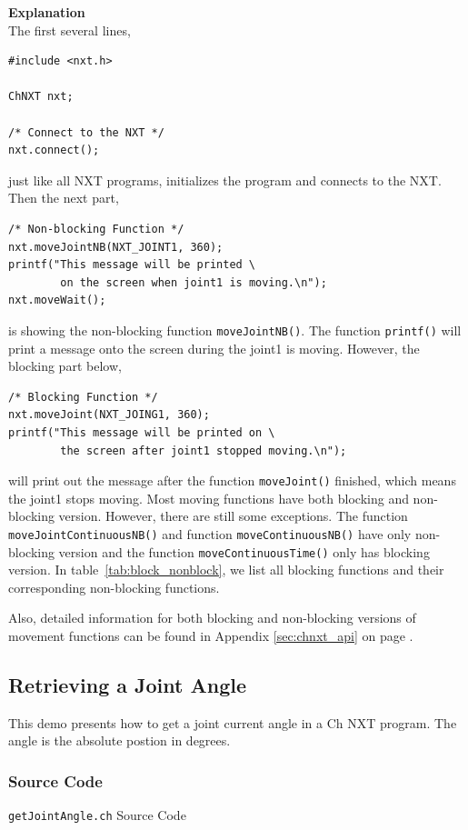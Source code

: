 \documentclass[11pt]{article}
\begin{document}
\noindent
\textbf{Explanation}\\
\newline
The first several lines,
\begin{verbatim}
#include <nxt.h>

ChNXT nxt;

/* Connect to the NXT */
nxt.connect();
\end{verbatim}
just like all NXT programs, initializes the program and connects to the NXT. Then the next part,
\begin{verbatim}
/* Non-blocking Function */
nxt.moveJointNB(NXT_JOINT1, 360);
printf("This message will be printed \
        on the screen when joint1 is moving.\n");
nxt.moveWait();
\end{verbatim}
is showing the non-blocking function \texttt{moveJointNB()}. The function \texttt{printf()} will
print a message onto the screen during the joint1 is moving. However, the blocking part below,
\begin{verbatim}
/* Blocking Function */
nxt.moveJoint(NXT_JOING1, 360);
printf("This message will be printed on \
        the screen after joint1 stopped moving.\n");
\end{verbatim}
will print out the message after the function \texttt{moveJoint()} finished, which means the
joint1 stops moving. Most moving functions have both blocking and non-blocking version. However,
there are still some exceptions. The function \texttt{moveJointContinuousNB()} and function
\texttt{moveContinuousNB()} have only non-blocking version and the function \texttt{moveContinuousTime()}
only has blocking version. In table~\ref{tab:block_nonblock}, we list all blocking functions and their 
corresponding non-blocking functions.

Also, detailed information for both blocking and non-blocking versions of movement functions can be found in Appendix 
\ref{sec:chnxt_api} on page \pageref{sec:chnxt_api}.

\subsection{Retrieving a Joint Angle}
This demo presents how to get a joint current angle in a Ch NXT program. The angle is the absolute postion in degrees.

\subsubsection*{Source Code}
\begin{Program}[H]
    {\small}
    \caption{\texttt{getJointAngle.ch} Source Code\label{prog_getJointAngle.ch}}
\end{Program}
\end{document}
